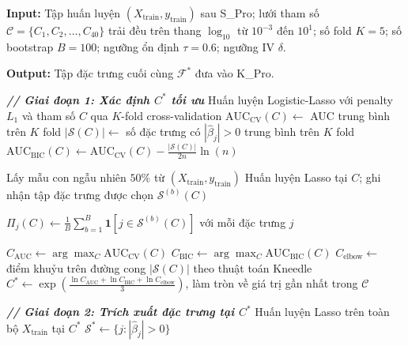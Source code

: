 \vspace{0.5em}
\begin{algorithm}[H]
\caption{Mã giả của quy trình chọn lọc đặc trưng L\_Pro}
\label{alg:l_pro}

\vspace{0.5em}
\textbf{Input:} Tập huấn luyện $(X_{\text{train}}, y_{\text{train}})$ sau S\_Pro; lưới tham số $\mathcal{C} = \{C_1, C_2, \dots, C_{40}\}$ trải đều trên thang $\log_{10}$ từ $10^{-3}$ đến $10^1$; số fold $K = 5$; số bootstrap $B = 100$; ngưỡng ổn định $\tau = 0.6$; ngưỡng IV $\delta$.

\vspace{0.5cm}

\textbf{Output:} Tập đặc trưng cuối cùng $\mathcal{F}^*$ đưa vào K\_Pro.

\begin{tcolorbox}
\begin{algorithmic}[1]
    \Statex \textbf{\textit{// Giai đoạn 1: Xác định $C^*$ tối ưu}}
        \State Huấn luyện Logistic-Lasso với penalty $L_1$ và tham số $C$ qua $K$-fold cross-validation
        \State $\text{AUC}_{\text{CV}}(C) \gets$ AUC trung bình trên $K$ fold
        \State $|\mathcal{S}(C)| \gets$ số đặc trưng có $|\hat{\beta}_j| > 0$ trung bình trên $K$ fold
        \State $\text{AUC}_{\text{BIC}}(C) \gets \text{AUC}_{\text{CV}}(C) - \frac{|\mathcal{S}(C)|}{2n}\ln(n)$
        
         
            \State Lấy mẫu con ngẫu nhiên $50\%$ từ $(X_{\text{train}}, y_{\text{train}})$
            \State Huấn luyện Lasso tại $C$; ghi nhận tập đặc trưng được chọn $\mathcal{S}^{(b)}(C)$
        \EndFor
        
        \State $\Pi_j(C) \gets \frac{1}{B}\sum_{b=1}^{B} \mathbf{1}[j \in \mathcal{S}^{(b)}(C)]$ với mỗi đặc trưng $j$ 
    \EndFor
    
    \State $C_{\text{AUC}} \gets \arg\max_{C} \text{AUC}_{\text{CV}}(C)$
    \State $C_{\text{BIC}} \gets \arg\max_{C} \text{AUC}_{\text{BIC}}(C)$
    \State $C_{\text{elbow}} \gets$ điểm khuỷu trên đường cong $|\mathcal{S}(C)|$ theo thuật toán Kneedle
    \State $C^* \gets \exp\left(\frac{\ln C_{\text{AUC}} + \ln C_{\text{BIC}} + \ln C_{\text{elbow}}}{3}\right)$, làm tròn về giá trị gần nhất trong $\mathcal{C}$

    \vspace{0.3cm}
    \Statex \textbf{\textit{// Giai đoạn 2: Trích xuất đặc trưng tại $C^*$}}
    \State Huấn luyện Lasso trên toàn bộ $X_{\text{train}}$ tại $C^*$
    \State $\mathcal{S}^* \gets \{j : |\hat{\beta}_j| > 0\}$ 


\end{algorithmic}
\end{tcolorbox}
\end{algorithm}
